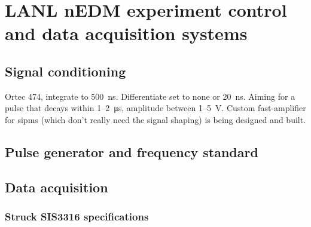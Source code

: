 
\chapter{LANL nEDM experiment control and data acquisition systems}\label{chap:daq}




\section{Signal conditioning}


Ortec 474, integrate to \qty{500}{\nano\second}. Differentiate set to none or \qty{20}{\nano\second}. Aiming for a pulse that decays within 1--\qty{2}{\micro \second}, amplitude between 1--\qty{5}{\volt}. Custom fast-amplifier for \acrshort*{sipm}s (which don't really need the signal shaping) is being designed and built.


\section{Pulse generator and frequency standard}\label{sec:pulse_gen_freq_std}



\cite{ds345_manual, rubidium_standard_fs725_manual}


\section{Data acquisition}




\subsection{Struck SIS3316 specifications}


